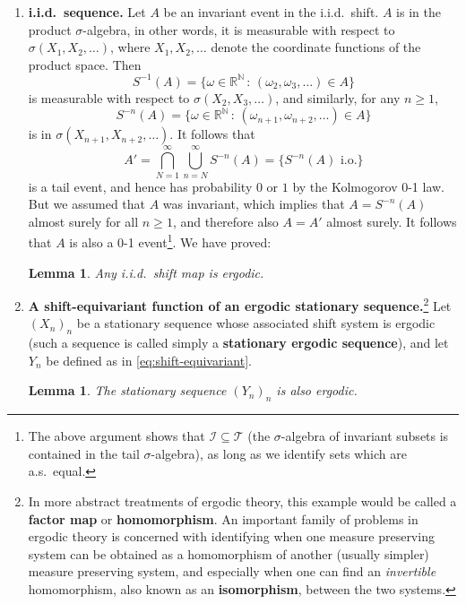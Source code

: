 \documentclass[12pt]{article}
\newtheorem{lem}[thm]{Lemma}
\newcommand{\R}{\mathbb{R}}
\newcommand{\N}{\mathbb{N}}
\theoremstyle{example}
\begin{document}
\begin{enumerate}[1.]
\item \textbf{i.i.d.\ sequence.} Let $A$ be an invariant event in the i.i.d.\ shift. $A$ is in the product $\sigma$-algebra, in other words, it is measurable with respect to $\sigma(X_1,X_2,\ldots)$, where $X_1,X_2,\ldots$ denote the coordinate functions of the product space. Then
$$ S^{-1}(A) = \{ \omega\in \R^\N \, : \, (\omega_2,\omega_3,\ldots) \in A \} $$
is measurable with respect to $\sigma(X_2,X_3,\ldots)$, and similarly, for any $n\ge 1$,
$$ S^{-n}(A) = \{ \omega\in \R^\N \, : \, (\omega_{n+1},\omega_{n+2},\ldots) \in A \} $$
is in $\sigma(X_{n+1},X_{n+2},\ldots)$. It follows that
$$ A'=\bigcap_{N=1}^\infty \bigcup_{n=N}^\infty S^{-n}(A) = \{ S^{-n}(A) \textrm{ i.o.} \} $$
is a tail event, and hence has probability $0$ or $1$ by the Kolmogorov 0-1 law. But we assumed that $A$ was invariant, which implies that $A=S^{-n}(A)$ almost surely for all $n\ge 1$, and therefore also $A=A'$ almost surely. It follows that $A$ is also a 0-1 event\footnote{The above argument shows that $\mathcal{I}\subseteq\mathcal{T}$ (the $\sigma$-algebra of invariant subsets is contained in the tail $\sigma$-algebra), as long as we identify sets which are a.s.\ equal.
}. We have proved:

\begin{lem} \label{lem-iid-ergodic} Any i.i.d.\ shift map is ergodic.
\end{lem}

\item \textbf{A shift-equivariant function of an ergodic stationary sequence.}\footnote{In more abstract treatments of ergodic theory, this example would be called a \textbf{factor map} or \textbf{homomorphism}. An important family of problems in ergodic theory is concerned with identifying when one measure preserving system can be obtained as a homomorphism of another (usually simpler) measure preserving system, and especially when one can find an \emph{invertible} homomorphism, also known as an \textbf{isomorphism}, between the two systems.} Let $(X_n)_n$ be a stationary sequence whose associated shift system is ergodic (such a sequence is called simply a \textbf{stationary ergodic sequence}), and let $Y_n$ be defined as in \eqref{eq:shift-equivariant}.

\begin{lem} The stationary sequence $(Y_n)_n$ is also ergodic.
\end{lem}


\end{enumerate}
\end{document}
